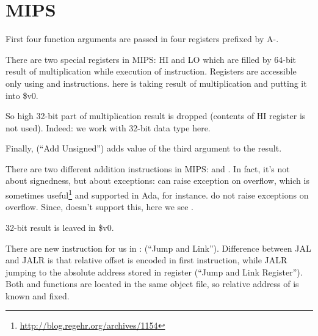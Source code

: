 ﻿\ifx\RUSSIAN\undefined
\section{MIPS}



First four function arguments are passed in four registers prefixed by A-.

There are two special registers in MIPS: HI and LO which are filled by 64-bit result of multiplication while
execution of  instruction.
Registers are accessible only using  and  instructions.
 here is taking result of multiplication and putting it into \$v0.

So high 32-bit part of multiplication result is dropped (contents of HI register is not used).
Indeed: we work with 32-bit \Tint data type here.

Finally,  (``Add Unsigned'') adds value of the third argument to the result.

There are two different addition instructions in MIPS:  and .
In fact, it's not about signedness, but about exceptions:  can raise exception on overflow,
which is sometimes useful\footnote{\url{http://blog.regehr.org/archives/1154}} and supported in Ada, for instance.
 do not raise exceptions on overflow.
Since, \CCpp doesn't support this, here we see .

32-bit result is leaved in \$v0.

There are new instruction for us in \main:  (``Jump and Link''). 
Difference between JAL and JALR is that relative offset is encoded in first instruction, 
while JALR jumping to the absolute address stored in register (``Jump and Link Register'').
Both \ttf and \main functions are located in the same object file, so relative address of \ttf 
is known and fixed.

\fi
